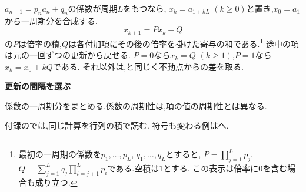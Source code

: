 $a_{n+1}=p_na_n+q_n$の係数が周期$L$をもつなら,
$x_k=a_{1+kL}$ $(k\ge0)$と置き,$x_0=a_1$から一周期分を合成する.
\[
  x_{k+1}=Px_k+Q
\]
の$P$は倍率の積,$Q$は各付加項にその後の倍率を掛けた寄与の和である.\footnote{最初の一周期の係数を$p_1,\ldots,p_L$, $q_1,\ldots,q_L$とすると,
  $P=\prod_{j=1}^L p_j$, $Q=\sum_{j=1}^L q_j\prod_{i=j+1}^L p_i$である.空積は$1$とする.
  この表示は倍率に$0$を含む場合も成り立つ.}
途中の項は元の一回ずつの更新から戻せる.
$P=0$なら$x_k=Q$ $(k\ge1)$,$P=1$なら$x_k=x_0+kQ$である.
それ以外は,と同じく不動点からの差を取る.

\begin{bookpoint}
  \textbf{更新の間隔を選ぶ}\par
  係数の一周期分をまとめる.係数の周期性は,項の値の周期性とは異なる.
\end{bookpoint}
付録のでは,同じ計算を行列の積で読む.
符号も変わる例はへ.
